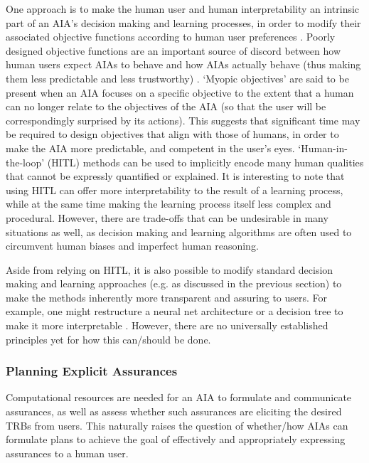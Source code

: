     One approach is to make the human user and human interpretability an intrinsic part of an AIA's decision making and learning processes, in order to modify their associated objective functions according to human user preferences \cite{Freitas2006-qo,Dragan2013-wd}. 
    Poorly designed objective functions are an important source of discord between how human users expect AIAs to behave and how AIAs actually behave (thus making them less predictable and less trustworthy) \cite{Amodei2016-xi}. 
    `Myopic objectives' are said to be present when an AIA focuses on a specific objective to the extent that a human can no longer relate to the objectives of the AIA (so that the user will be correspondingly surprised by its actions). This suggests that significant time may be required to design objectives that align with those of humans, in order to make the AIA more predictable, and competent in the user's eyes. 
    `Human-in-the-loop' (HITL) methods can be used to implicitly encode many human qualities that cannot be expressly quantified or explained. 
    It is interesting to note that using HITL can offer more interpretability to the result of a learning process, while at the same time making the learning process itself less complex and procedural. 
    However, there are trade-offs that can be undesirable in many situations as well, as decision making and learning algorithms are often used to circumvent human biases and imperfect human reasoning. 

    Aside from relying on HITL, it is also possible to modify standard decision making and learning approaches (e.g. as discussed in the previous section) to make the methods inherently more transparent and assuring to users. For example, one might restructure a neural net architecture or a decision tree to make it more interpretable \cite{Choi2016-by,Abdollahi2016-vn,Jovanovic2016-gw}. However, there are no universally established principles yet for how this can/should be done.

\subsubsection{Planning Explicit Assurances}
    Computational resources are needed for an AIA to formulate and communicate assurances, as well as assess whether such assurances are eliciting the desired TRBs from users. This naturally raises the question of whether/how AIAs can formulate plans to achieve the goal of effectively and appropriately expressing assurances to a human user. 

